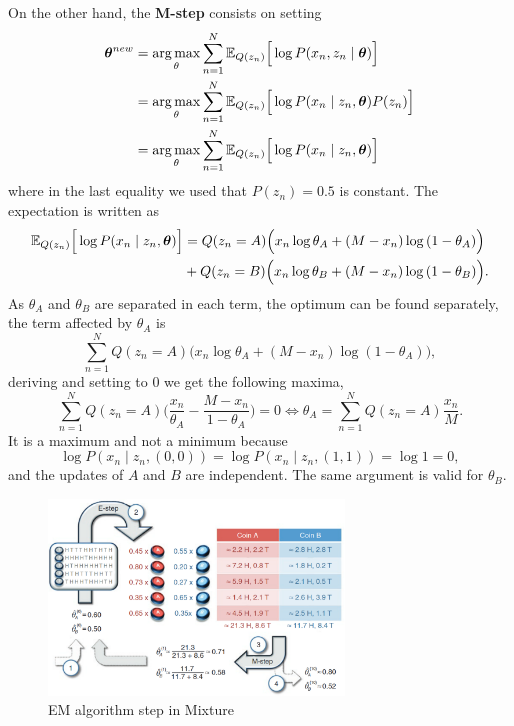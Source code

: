 On the other hand, the \textbf{M-step} consists on setting
\[
  \begin{aligned}
    \bm{\theta}^{new} &= \operatorname*{arg\,max}_{\theta} \sum_{n=1}^{N}\mathbb{E}_{Q(z_{n})}\Big[\log P(x_{n}, z_{n} \mid \bm{\theta})\Big]\\
    &= \operatorname*{arg\,max}_{\theta} \sum_{n=1}^{N}\mathbb{E}_{Q(z_{n})}\Big[\log P(x_{n} \mid z_{n}, \bm{\theta})P(z_{n})\Big]\\
    &= \operatorname*{arg\,max}_{\theta} \sum_{n=1}^{N}\mathbb{E}_{Q(z_{n})}\Big[\log P(x_{n} \mid z_{n}, \bm{\theta})\Big]
  \end{aligned}
\]
where in the last equality we used that \(P(z_{n}) = 0.5\) is constant. The expectation is written as
\[
  \begin{aligned}
    \mathbb{E}_{Q(z_{n})}\Big[\log P(x_{n} \mid z_{n}, \bm{\theta})\Big] &= Q(z_{n} = A)\Big( x_{n}\log{\theta_{A}} + (M - x_{n})\log{(1 - \theta_{A})} \Big)\\
    &+ Q(z_{n} = B)\Big( x_{n}\log{\theta_{B}} + (M - x_{n})\log{(1 - \theta_{B})} \Big).
  \end{aligned}
\]
As \(\theta_{A}\) and \(\theta_{B}\) are separated in each term, the optimum can be found separately, the term affected by \(\theta_{A}\) is
\[
  \sum_{n=1}^{N} Q(z_{n}=A) \Big(x_{n}\log{\theta_{A}} + (M - x_{n})\log{(1-\theta_{A})}\Big),
\]
deriving and setting to \(0\) we get the following maxima,
\[
  \sum_{n=1}^{N}Q(z_{n}=A)\Big(\frac{x_{n}}{\theta_{A}} - \frac{M - x_{n}}{1- \theta_{A}}\Big) = 0 \iff \theta_{A} = \sum_{n=1}^{N}Q(z_{n}=A)\frac{x_{n}}{M}.
\]
It is a maximum and not a minimum because
\[
  \log P(x_{n}\mid z_{n},(0,0)) = \log P(x_{n} \mid z_{n}, (1,1)) = \log 1 = 0,
\]
and the updates of \(A\) and \(B\) are independent. The same argument is valid for \(\theta_{B}\).

\begin{figure}
  \centering
  \includegraphics[width=0.7\textwidth]{tex/images/mixture}
  \caption{EM algorithm step in Mixture~\cite{do2008expectation}}\label{fig:mixture}
\end{figure}

